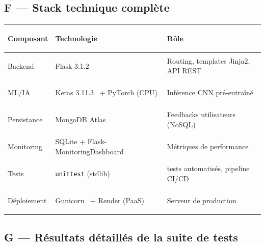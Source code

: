 \documentclass[french, a4paper, 12pt]{article}
\begin{document}
\subsection*{F --- Stack technique complète}

\renewcommand{\arraystretch}{1.25}
\begin{tabularx}{\textwidth}{%
    >{\bfseries\raggedright}p{2.8cm}
    >{\raggedright}p{3.5cm}
    >{\raggedright\arraybackslash}X}
    \toprule
    Composant & Technologie & Rôle \\
    \midrule
    Backend     & Flask 3.1.2~\cite{Flask}              & Routing, templates Jinja2, API REST \\
    ML/IA       & Keras 3.11.3~\cite{Keras} + PyTorch (CPU) & Inférence CNN pré-entraîné \\
    Persistance & MongoDB Atlas~\cite{MongoDB}            & Feedbacks utilisateurs (NoSQL) \\
    Monitoring  & SQLite + Flask-MonitoringDashboard~\cite{FlaskMonitoring} & Métriques de performance \\
    Tests       & \texttt{unittest} (stdlib)~\cite{PythonUnittest} & 15 tests automatisés, pipeline CI/CD \\
    Déploiement & Gunicorn~\cite{Gunicorn} + Render (PaaS)  & Serveur de production \\
    \bottomrule
\end{tabularx}

\subsection*{G --- Résultats détaillés de la suite de tests}
\end{document}
